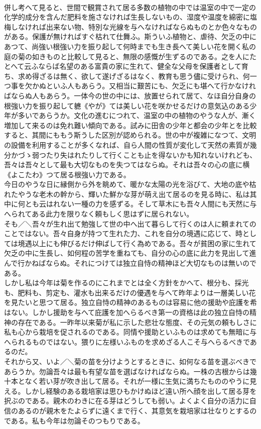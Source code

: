 \documentclass[8pt]{extreport}
\begin{document}
\begin{CJK}{UTF8}{min}
\\	併し考へて見ると、世間で観賞されて居る多数の植物の中では温室の中で一定の化学的成分を含んだ肥料を施さなければ生長しないもの、湿度や温度を綿密に塩梅しなければ出来ない物、特別な光線を与へなければならぬものとか色々なものがある。保護が無ければすぐ枯れて仕舞ふ。斯ういふ植物と、虐待、欠乏の中にあつて、尚強い根強い力を振り起して何時までも生き長へて美しい花を開く私の庭の菊の如きものと比較して見ると、無限の感慨が生ずるのである。之を人にたとへて云ふならば名望のある富貴の家に生れて、健全な父母を保護者として育ち、求め得ざるは無く、欲して遂げざるはなく、教育も思う儘に受けられ、何一つ事を欠かぬといふ人もあらう。又相当に艱苦にも、欠乏にも堪へて行かなければならぬ人もあらう。一体今の世の中には、放置せられて居て、なほ自分自身の根強い力を振り起して軈《やが》ては美しい花を咲かせるだけの意気込のある少年が多いであらうか。文化の進むにつれて、温室の中の植物のやうな人が、漸く増加して来るのは免れ難い傾向である。試みに田舎の少年と都会の少年とを比較すると、其間にももう斯うした区別が認められる。世の中が複雑になつて、文明の設備を利用することが多くなれば、自ら人間の性質が変化して天然の素質が幾分かづゝ弱つたり失はれたりして行くことも止を得ないかも知れないけれども、吾々は吾々として最も大切なものを失つてはならぬ。それは吾々の心の底に横《よこたわ》つて居る根強い力である。
\\	今日のやうな日に縁側から外を眺めて、暖かな太陽の光を浴びて、大地の底や枯れたやうな老木の幹から、輝いた鮮かな芽が萌え出て居るのを見る時に、私は其中に何とも云はれない一種の力を感ずる。そして草木にも吾々人間にも天然に与へられてある此力を限りなく頼もしく思はずに居られない。
\\	そも／＼吾々が生れ出て勉強して世の中へ出て暮らして行くのは人に頼まれてのことではない。吾々自身が持つて生れた力、これを自分の境遇に応じて、時としては境遇以上にも伸びるだけ伸ばして行く為めである。吾々が貧困の家に生れて欠乏の中に生長し、如何程の苦学を重ねても、自分の心の底に此力を見出して進んで行かねばならぬ。それにつけては独立自恃の精神ほど大切なものは無いのである。
\\	しかし私は今年は菊を作るのにこれまでとは全く方針をかへて、根分も、採光も、肥料も、剪定も、灌水も出来るだけの優遇を与へて昨年よりは一層美しい花を見たいと思つて居る。独立自恃の精神のあるものは容易に他の援助や庇護を希はない。しかし援助を与へて庇護を加へらるべき第一の資格は此の独立自恃の精神の存在である。一昨年以来菊が私に示した悲壮な態度、その元気の頼もしさに私も心から栽培を促されるのである。同情や援助といふものは求めても無暗に与へられるものではない。猥りに左様いふものを求めざる人こそ与へらるべきであるのだ。
\\	それから又、いよ／＼菊の苗を分けようとするときに、如何なる苗を選ぶべきであらうか。勿論吾々は最も有望な苗を選ばなければならぬ。一株の古根からは幾十本となく若い芽が吹き出して居る。それが一様に生気に満ちたもののやうに見える。しかし経験のある栽培家は思ひもかけぬほど遠い所へ顔を出して居る芽を択ぶのである。親木のわきに在る芽はどうしても弱い。よくよく自分の活力に自信のあるのが親木をたよらずに遠くまで行く、其意気を栽培家は壮なりとするのである。私も今年は勿論そのつもりである。

\end{CJK}
\end{document}
